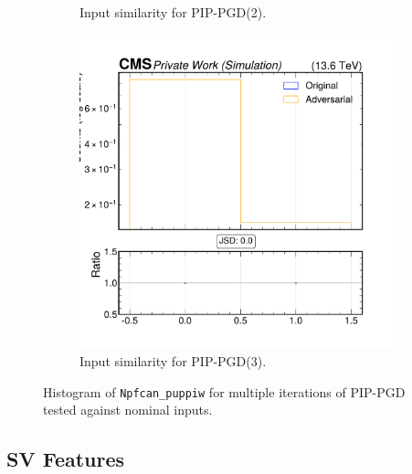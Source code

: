 \begin{figure}[htbp]
\begin{subfigure}[t]{0.32\textwidth}
    \caption*{Input similarity for PIP-PGD(2).}
  \end{subfigure}\hfill
  \begin{subfigure}[t]{0.32\textwidth}
    \includegraphics[width=\linewidth]{media/output/features/compare/combined_it_3/cmp_npf_arr_Npfcan_puppiw.pdf}
    \caption*{Input similarity for PIP-PGD(3).}
  \end{subfigure}

  \caption*{Histogram of \texttt{Npfcan\_puppiw} for multiple iterations of PIP-PGD tested against nominal inputs.}
  \label{fig:combined_input_Npfcan_puppiw}
\end{figure}


\newpage
\subsection*{SV Features}

